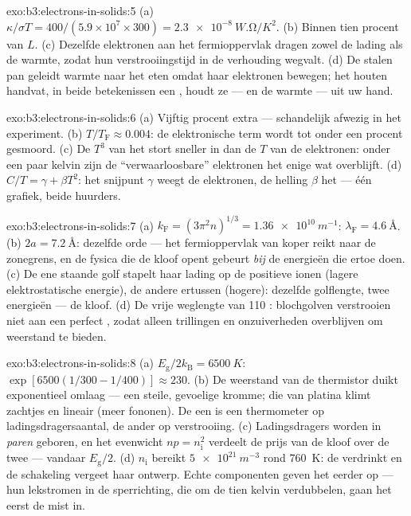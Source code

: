 \begin{solution}{exo:b3:electrons-in-solids:5}
(a) $\kappa/\sigma T = 400/(5.9\times10^7\times300) =
\qty{2.3e-8}{W.\ohm/K^2}$. (b) Binnen tien procent van $L$. (c)
Dezelfde elektronen aan het fermioppervlak dragen zowel de lading als de
warmte, zodat hun verstrooiingstijd in de verhouding wegvalt. (d) De
stalen pan geleidt warmte naar het eten omdat haar elektronen bewegen;
het houten handvat, in beide betekenissen een , houdt ze ---
en de warmte --- uit uw hand.
\end{solution}

\begin{solution}{exo:b3:electrons-in-solids:6}
(a) Vijftig procent extra --- schandelijk afwezig in het experiment.
(b) $T/T_{\text{F}} \approx 0.004$: de elektronische term wordt
tot onder een procent gesmoord. (c) De $T^3$ van het  stort
sneller in dan de $T$ van de elektronen: onder een paar kelvin zijn de
``verwaarloosbare'' elektronen het enige wat overblijft. (d) $C/T =
\gamma + \beta T^2$: het snijpunt $\gamma$ weegt de elektronen,
de helling $\beta$ het  --- één grafiek, beide huurders.
\end{solution}

\begin{solution}{exo:b3:electrons-in-solids:7}
(a) $k_{\text{F}} = (3\pi^2n)^{1/3} = \qty{1.36e10}{m^{-1}}$:
$\lambda_{\text{F}} = \qty{4.6}{\angstrom}$. (b) $2a =
\qty{7.2}{\angstrom}$: dezelfde orde --- het fermioppervlak van koper
reikt naar de zonegrens, en de fysica die de kloof opent
gebeurt \emph{bij} de energieën die ertoe doen. (c) De ene staande golf
stapelt haar lading op de positieve ionen (lagere elektrostatische
energie), de andere ertussen (hogere): dezelfde golflengte, twee
energieën --- de kloof. (d) De vrije weglengte van 110 :
blochgolven verstrooien niet aan een perfect , zodat alleen
trillingen en onzuiverheden overblijven om weerstand te bieden.
\end{solution}

\begin{solution}{exo:b3:electrons-in-solids:8}
(a) $E_{\text{g}}/2k_{\text{B}} = \qty{6500}{K}$:
$\exp[6500(1/300 - 1/400)] \approx 230$. (b) De weerstand van de
thermistor duikt exponentieel omlaag --- een steile, gevoelige kromme;
die van platina klimt zachtjes en lineair (meer fononen). De een is een
thermometer op ladingsdragersaantal, de ander op verstrooiing. (c)
Ladingsdragers worden in \emph{paren} geboren, en het
evenwicht $np = n_{\text{i}}^2$ verdeelt de prijs van de kloof over
de twee --- vandaar $E_{\text{g}}/2$. (d)
$n_{\text{i}}$ bereikt $\qty{5e21}{m^{-3}}$ rond \qty{760}{K}:
de  verdrinkt en de schakeling vergeet haar ontwerp. Echte
componenten geven het eerder op --- hun lekstromen in de sperrichting, die om de
tien kelvin verdubbelen, gaan het eerst de mist in.
\end{solution}

